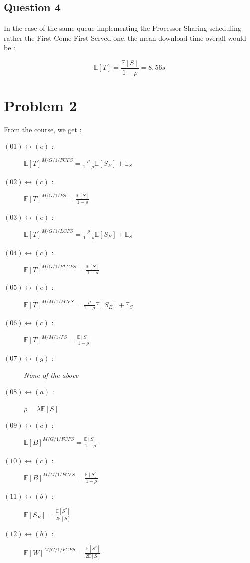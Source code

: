 \documentclass[a4paper]{report}
\begin{document}
\subsection*{Question 4}
In the case of the same queue implementing the Processor-Sharing scheduling rather the First Come First Served one, the mean download time overall would be : 

\[\mathbb{E}[T] = \frac{\mathbb{E}[S]}{1- \rho} = 8,56s \]
\newpage
\section*{Problem 2}
From the course, we get : \\
\begin{description}
\item[$(01)\leftrightarrow (e)$ :] $\mathbb{E}[T]^{M/G/1/FCFS} = \frac{\rho}{1-\rho} \mathbb{E}[S_{E}]+\mathbb{E}_{S}$
\item[$(02)\leftrightarrow (c)$ :] $\mathbb{E}[T]^{M/G/1/PS} = \frac{\mathbb{E}[S]}{1-\rho} $
\item[$(03)\leftrightarrow (e)$ :] $\mathbb{E}[T]^{M/G/1/LCFS} =\frac{\rho}{1-\rho} \mathbb{E}[S_{E}]+\mathbb{E}_{S}$
\item[$(04)\leftrightarrow (c)$ :] $\mathbb{E}[T]^{M/G/1/PLCFS} =\frac{\mathbb{E}[S]}{1-\rho}$
\item[$(05)\leftrightarrow (e)$ :] $\mathbb{E}[T]^{M/M/1/FCFS} =\frac{\rho}{1-\rho} \mathbb{E}[S_{E}]+\mathbb{E}_{S}$
\item[$(06)\leftrightarrow (c)$ :] $\mathbb{E}[T]^{M/M/1/PS} =\frac{\mathbb{E}[S]}{1-\rho}$
\item[$(07)\leftrightarrow (g)$ :] \textit{None of the above}
\item[$(08)\leftrightarrow (a)$ :] $\rho = \lambda \mathbb{E}[S]$
\item[$(09)\leftrightarrow (c)$ :] $\mathbb{E}[B]^{M/G/1/FCFS} =\frac{\mathbb{E}[S]}{1-\rho}$
\item[$(10)\leftrightarrow (c)$ :] $\mathbb{E}[B]^{M/M/1/FCFS} =\frac{\mathbb{E}[S]}{1-\rho}$
\item[$(11)\leftrightarrow (b)$ :] $\mathbb{E}[S_{E}] = \frac{\mathbb{E}[S^{2}]}{2 \mathbb{E}[S]}$
\item[$(12)\leftrightarrow (b)$ :] $\mathbb{E}[W]^{M/G/1/FCFS} = \frac{\mathbb{E}[S^{2}]}{2 \mathbb{E}[S]}$

\end{description}
\newpage
\end{document}
